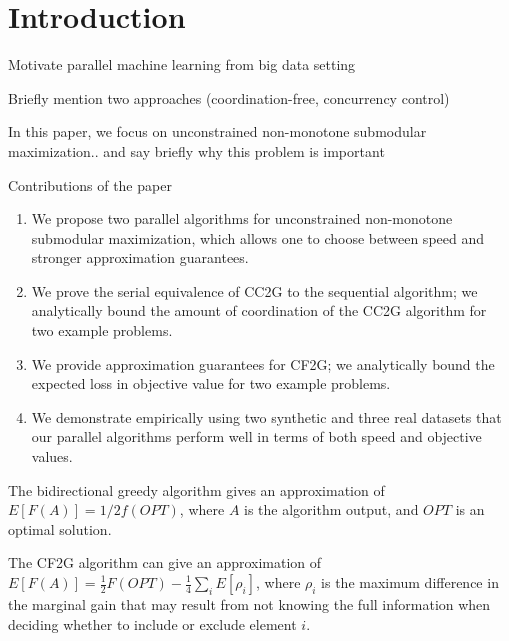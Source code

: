 \documentclass{article} %
\newcommand{\hogwild}{CF2G}
\newcommand{\occ}{CC2G}
\begin{document}
\begin{abstract}

\end{abstract}

\section{Introduction}


Motivate parallel machine learning from big data setting

Briefly mention two approaches (coordination-free, concurrency control)

In this paper, we focus on unconstrained non-monotone submodular maximization.. and say briefly why this problem is important

Contributions of the paper
\begin{enumerate}
\item We propose two parallel algorithms for unconstrained non-monotone submodular maximization, which allows one to choose between speed and stronger approximation guarantees.
\item We prove the serial equivalence of \occ{} to the sequential algorithm; we analytically bound the amount of coordination of the \occ{} algorithm for two example problems.
\item We provide approximation guarantees for \hogwild{}; we analytically bound the expected loss in objective value for two example problems.
\item We demonstrate empirically using two synthetic and three real datasets that our parallel algorithms perform well in terms of both speed and objective values.
\end{enumerate}



The bidirectional greedy algorithm \cite{buchbinder2012} gives an approximation of $E[F(A)] = 1/2 f(OPT)$, where $A$ is the algorithm output, and $OPT$ is an optimal solution.

The \hogwild{} algorithm can give an approximation of $E[F(A)] = \frac{1}{2} F(OPT) - \frac{1}{4}\sum_iE[\rho_i]$, where $\rho_i$ is the maximum difference in the marginal gain that may result from not knowing the full information when deciding whether to include or exclude element $i$.
\end{document}
